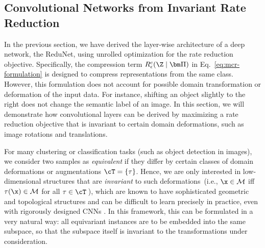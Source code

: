 \documentclass[../../book-main.tex]{subfiles}
\begin{document}
\subsection{Convolutional Networks from Invariant Rate Reduction}\label{sec:shift-invariant}

In the previous section, we have derived the layer-wise architecture of a deep network, the ReduNet, using unrolled optimization for the rate reduction objective. 
Specifically, the compression term $R^c_\epsilon(\Z \mid\bm \Pi)$ in Eq.~\eqref{eq:mcr-formulation} is designed to compress representations from the same class. However, this formulation does not account for possible domain transformation or deformation of the input data. For instance, shifting an object slightly to the right does not change the semantic label of an image.  In this section, we will demonstrate how convolutional layers can be derived by maximizing a rate reduction objective that is invariant to certain domain deformations, such as image rotations and translations. 


For many clustering or classification tasks (such as object detection in images), we consider two samples as {\em equivalent} if they differ by certain classes of domain deformations or augmentations $\cT = \{\tau \}$. Hence, we are only interested in low-dimensional structures that are {\em invariant} to such deformations~(i.e., $\x \in \mathcal{M}$ iff $\tau(\x) \in \mathcal{M}$ for all $\tau \in \cT$\,), 
which are known to have sophisticated geometric and topological structures and can be difficult to learn precisely in practice, even with rigorously designed CNNs \cite{Cohen-ICML-2016}. 
In this framework, this can be formulated in a very natural way: all equivariant instances are to be embedded into the same subspace, so that the subspace itself is invariant to the transformations under consideration.
\end{document}
